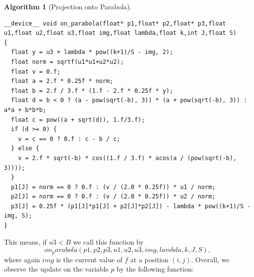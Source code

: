 \documentclass{scrreprt}
\newtheorem{algorithm}[theorem]{Algorithm}
\begin{document}
            \begin{algorithm}[Projection onto Parabola]
                \label{alg:projection_onto_parabola}
                \begin{lstlisting}
__device__ void on_parabola(float* p1,float* p2,float* p3,float u1,float u2,float u3,float img,float lambda,float k,int J,float S)
{
  float y = u3 + lambda * pow((k+1)/S - img, 2);
  float norm = sqrtf(u1*u1+u2*u2);
  float v = 0.f;
  float a = 2.f * 0.25f * norm;
  float b = 2.f / 3.f * (1.f - 2.f * 0.25f * y);
  float d = b < 0 ? (a - pow(sqrt(-b), 3)) * (a + pow(sqrt(-b), 3)) : a*a + b*b*b;
  float c = pow((a + sqrt(d)), 1.f/3.f);
  if (d >= 0) {
    v = c == 0 ? 0.f : c - b / c;
  } else {
    v = 2.f * sqrt(-b) * cos((1.f / 3.f) * acos(a / (pow(sqrt(-b), 3))));
  }
  p1[J] = norm == 0 ? 0.f : (v / (2.0 * 0.25f)) * u1 / norm;
  p2[J] = norm == 0 ? 0.f : (v / (2.0 * 0.25f)) * u2 / norm;
  p3[J] = 0.25f * (p1[J]*p1[J] + p2[J]*p2[J]) - lambda * pow((k+1)/S - img, S);
}
                \end{lstlisting}
            \end{algorithm}

            This means, if $u3 < B$ we call this function by
                $$
                    on_parabola(p1, p2, p3, u1, u2, u3, img, lambda, k, J, S),
                $$
            where again $img$ is the current value of $f$ at a position $(i,j)$. Overall, we observe the update on the variable $p$ by the following function:
\end{document}
